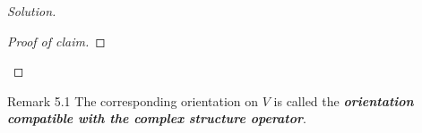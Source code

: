 \begin{proof}[Solution]
\begin{proof}[Proof of claim]
\iffalse
	\begin{align*}\omega^2&=\left(a_{12}\alpha_{12} \right)\wedge \left( a_{12}\alpha_{12} \right) \\
		&=\big(a_{12}(\varepsilon_1\wedge -I\varepsilon_1)\big)\wedge \big(a_{12}(\varepsilon_1\wedge -I\varepsilon_1)\big)\\
		&=a_{12}^2\big(\varepsilon_1\wedge (-I\varepsilon_1)\wedge \varepsilon_1\wedge (-I\varepsilon_1)\big)
	\end{align*}
In general,
	\begin{align*}\omega^2&=\left( \sum a_{ij}\alpha_{ij} \right)\wedge \left( \sum a_{k\ell}\alpha_{k\ell} \right) \\
		&=\sum a_{ij}a_{k\ell}\alpha_{ij}\wedge \alpha_{k\ell}
	\end{align*}\


	\end{proof}

	To see this suppose $e_1,\ldots,e_n$ are a basis of the complex vector space induced by $I$, and let $\varepsilon_i(e_j)=\delta_{ij}$ be its dual basis. Then a basis for $V$ is $e_1,Ie_1,\ldots,e_n,Ie_n$.

	just notice that any two volume forms $\omega^n,\eta^n \in\operatorname{Pos}^n$ {\color{6}have the same sign on the basis $e_1,Ie_1,\ldots,e_n,Ie_n$} (here $e_1,\ldots,e_n$ are a basis of the complex vector space induced by $I$). 


	{\color{6}But how to show that? The expression for $\omega^n$ is not  obvious and it contains permutations of the vectors; not only things of the form $\omega(e_i,Ie_i)$…}

$\mathsf{OK}$ so what is an $n$-th form? A linear

\iffalse Indeed,
	\begin{align*}
		\omega^n(e_1,Ie_1,\ldots,e_n,Ie_n)&=\omega(e_1,Ie_1)\wedge \ldots \wedge \omega(e_n,Ie_n)\\
		&=
	\end{align*}\fi\fi
\end{proof}
\end{proof}

\begin{thing8}{Remark 5.1}\leavevmode
	The corresponding orientation on $V$ is called the \textit{\textbf{orientation compatible with the complex structure operator}}.
\end{thing8}

